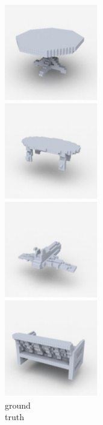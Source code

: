 \documentclass[14pt]{beamer}
\begin{document}
\begin{frame}
\begin{figure}
\begin{subfigure}[t]{0.18\textwidth}
        \includegraphics[scale=0.39]{qual_rgb_gt}\\
        {\footnotesize ground\\[-4px]truth}
      \end{subfigure}
      \begin{subfigure}[t]{0.18\textwidth}
        \centering

\end{subfigure}
\end{figure}
\end{frame}
\end{document}
